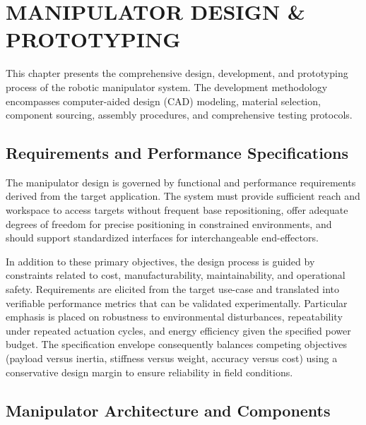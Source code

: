 \chapter{MANIPULATOR DESIGN \& PROTOTYPING}

This chapter presents the comprehensive design, development, and prototyping process of the robotic manipulator system. The development methodology encompasses computer-aided design (CAD) modeling, material selection, component sourcing, assembly procedures, and comprehensive testing protocols.

\section{Requirements and Performance Specifications}

The manipulator design is governed by functional and performance requirements derived from the target application. The system must provide 
sufficient reach and workspace to access targets without frequent base repositioning, offer adequate degrees of freedom for precise positioning
 in constrained environments, and should support standardized interfaces for interchangeable end-effectors.

In addition to these primary objectives, the design process is guided by constraints related to cost, manufacturability, maintainability,
 and operational safety. Requirements are elicited from the target use-case and translated into verifiable performance metrics that can be 
 validated experimentally. Particular emphasis is placed on robustness to environmental disturbances, repeatability under repeated actuation 
 cycles, and energy efficiency given the specified power budget. The specification envelope consequently balances competing objectives
  (payload versus inertia, stiffness versus weight, accuracy versus cost) using a conservative design margin to ensure reliability in field 
  conditions.


\section{Manipulator Architecture and Components}

